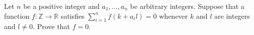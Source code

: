 Let $ n$ be a positive integer and $ a_{1}, \ldots, a_{n}$ be arbitrary integers. Suppose that a function $ f: \mathbb{Z}\to \mathbb{R}$ satisfies $ \sum_{i=1}^{n}f(k+a_{i}l) = 0$ whenever $ k$ and $ l$ are integers and $ l \ne 0$. Prove that $ f = 0$.